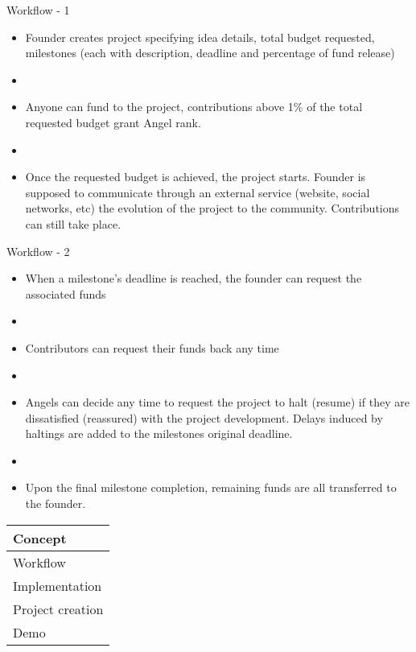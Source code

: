 \documentclass{beamer}
\begin{document}
\begin{frame}{Workflow - 1}
\begin{itemize}
	\item Founder creates project specifying idea details, total budget requested, milestones (each with description, deadline and percentage of fund release)
	\item[]
	\item Anyone can fund to the project, contributions above 1\% of the total requested budget grant Angel rank.
	\item[]
	\item Once the requested budget is achieved, the project starts. Founder is supposed to communicate through an external service (website, social networks, etc) the evolution of the project to the community. Contributions can still take place.
\end{itemize}
\end{frame}

\begin{frame}{Workflow - 2}
\begin{itemize}
	\item When a milestone's deadline is reached, the founder can request the associated funds
	\item[]
	\item Contributors can request their funds back any time
	\item[]
	\item Angels can decide any time to request the project to halt (resume) if they are dissatisfied (reassured) with the project development. Delays induced by haltings are added to the milestones original deadline.
	\item[]
	\item Upon the final milestone completion, remaining funds are all transferred to the founder.
\end{itemize}
\end{frame}


\begin{frame}
	\begin{tabularx}{\textwidth}{X}
		\hline
		Concept\\
		\hline
		Workflow\\
		\hline
		\rowcolor{hcolor}
		Implementation\\
		\hline
		Project creation\\
		\hline
		Demo\\
		\hline
	\end{tabularx}
\end{frame}
\end{document}
